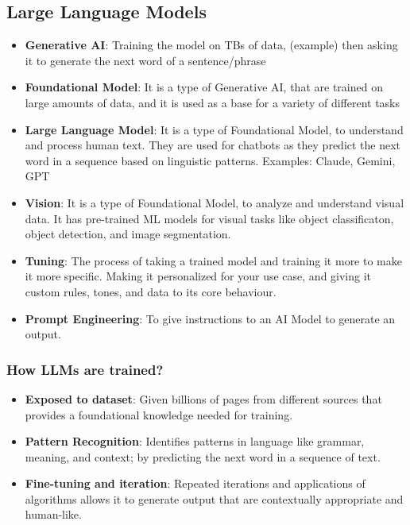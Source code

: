 \documentclass[12pt, letterpaper]{article}
\begin{document}
\subsection{Large Language Models}
\begin{itemize}
    \item \textbf{Generative AI}: Training the model on TBs of data, (example) then asking it to generate the next word of a sentence/phrase
    \item \textbf{Foundational Model}: It is a type of Generative AI, that are trained on large amounts of data, and it is used as a base for a variety of different tasks
    \item \textbf{Large Language Model}: It is a type of Foundational Model, to understand and process human text. They are used for chatbots as they predict the next word in a sequence based on linguistic patterns. Examples: Claude, Gemini, GPT
    \item \textbf{Vision}: It is a type of Foundational Model, to analyze and understand visual data. It has pre-trained ML models for visual tasks like object classificaton, object detection, and image segmentation. 
    \item \textbf{Tuning}: The process of taking a trained model and training it more to make it more specific. Making it personalized for your use case, and giving it custom rules, tones, and data to its core behaviour.
    \item \textbf{Prompt Engineering}: To give instructions to an AI Model to generate an output.
\end{itemize}

\subsubsection{How LLMs are trained?}
\begin{itemize}
    \item \textbf{Exposed to dataset}: Given billions of pages from different sources that provides a foundational knowledge needed for training.
    \item \textbf{Pattern Recognition}: Identifies patterns in language like grammar, meaning, and context; by predicting the next word in a sequence of text.
    \item \textbf{Fine-tuning and iteration}: Repeated iterations and applications of algorithms allows it to generate output that are contextually appropriate and human-like.
\end{itemize}
\end{document}
